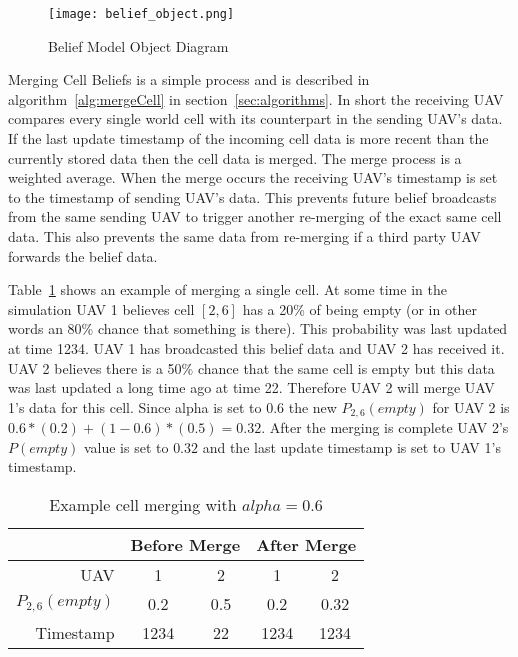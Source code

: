 \begin{figure}[H]
	\centering
	\texttt{[image: belief\_object.png]}
	\caption{Belief Model Object Diagram}
	\label{fig:belief_object}
\end{figure}
\begin{multicols*}{2}


Merging Cell Beliefs is a simple process and is described in algorithm~\ref{alg:mergeCell} in section~\ref{sec:algorithms}.   In short the receiving UAV compares every single world cell with its counterpart in the sending UAV's data.  If the last update timestamp of the incoming cell data is more recent than the currently stored data then the cell data is merged.  The merge process is a weighted average.  When the merge occurs the receiving UAV's timestamp is set to the timestamp of sending UAV's data.  This prevents future belief broadcasts from the same sending UAV to trigger another re-merging of the exact same cell data.  This also prevents the same data from re-merging if a third party UAV forwards the belief data. 

Table~\ref{tab:exampleCellMerge} shows an example of merging a single cell.  At some time in the simulation UAV 1 believes cell $[2, 6]$ has a 20\% of being empty (or in other words an 80\% chance that something is there). This probability was last updated at time 1234.  UAV 1 has broadcasted this belief data and UAV 2 has received it.  UAV 2 believes there is a 50\% chance that the same cell is empty but this data was last updated a long time ago at time 22.  Therefore UAV 2 will merge UAV 1's data for this cell.  Since alpha is set to 0.6 the new $P_{2,6}(empty)$ for UAV 2 is $0.6*(0.2) + (1-0.6)*(0.5)=0.32$.  After the merging is complete UAV 2's $P(empty)$ value is set to $0.32$ and the last update timestamp is set to UAV 1's timestamp.

\begin{table}[H]
	\caption{Example cell merging with $alpha=0.6$}
	\centering
	\label{tab:exampleCellMerge}
	\begin{tabular}{|r|c|c||c|c|}
		\hline
		                & \multicolumn{2}{c||}{Before Merge} & \multicolumn{2}{c|}{After Merge} \\
		\hline
		UAV             & 1   & 2                            & 1   & 2 \\
		\hline
		$P_{2,6}(empty)$& 0.2 & 0.5                          & 0.2 & 0.32 \\
		\hline
		Timestamp       & 1234& 22                           & 1234& 1234 \\
		\hline
	\end{tabular}
\end{table}


\end{multicols*}
